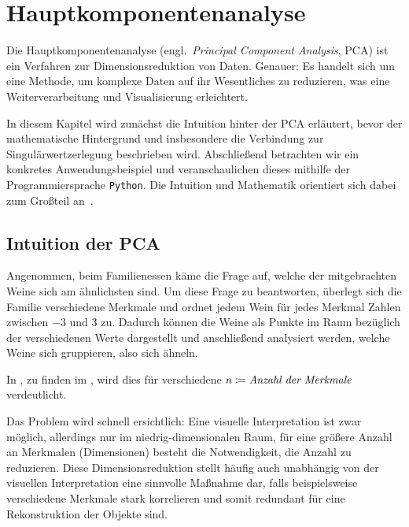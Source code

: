 \chapter{Hauptkomponentenanalyse}   

Die Hauptkomponentenanalyse (engl.\ \emph{Principal Component Analysis}, PCA) ist ein Verfahren zur Dimensionsreduktion von Daten.
Genauer: Es handelt sich um eine Methode, um komplexe Daten auf ihr Wesentliches zu reduzieren, was eine Weiterverarbeitung und Visualisierung erleichtert.

In diesem Kapitel wird zunächst die Intuition hinter der PCA erläutert, bevor der mathematische Hintergrund und insbesondere die Verbindung zur Singulärwertzerlegung beschrieben wird.
Abschließend betrachten wir ein konkretes Anwendungsbeispiel und veranschaulichen dieses mithilfe der Programmiersprache \texttt{Python}.
Die Intuition und Mathematik orientiert sich dabei zum Großteil an~\cite[S.~165-169]{ngMachineLearningCS2292023}.

\section{Intuition der PCA}
Angenommen, beim Familienessen käme die Frage auf, welche der mitgebrachten Weine sich am ähnlichsten sind. 
Um diese Frage zu beantworten, überlegt sich die Familie verschiedene Merkmale und ordnet jedem Wein für jedes Merkmal Zahlen zwischen \num{-3} und \num{3} zu.
Dadurch können die Weine als Punkte im Raum bezüglich der verschiedenen Werte dargestellt und anschließend analysiert werden, welche Weine sich gruppieren, also sich ähneln. 

In , zu finden im , wird dies für verschiedene \(n \coloneqq \emph{Anzahl der Merkmale}\) verdeutlicht. 

Das Problem wird schnell ersichtlich:
Eine visuelle Interpretation ist zwar möglich, allerdings nur im niedrig-dimensionalen Raum, für eine größere Anzahl an Merkmalen (Dimensionen) besteht die Notwendigkeit, die Anzahl zu reduzieren.
Diese Dimensionsreduktion stellt häufig auch unabhängig von der visuellen Interpretation eine sinnvolle Maßnahme dar, falls beispielsweise verschiedene Merkmale stark korrelieren und somit redundant für eine Rekonstruktion der Objekte sind. 

